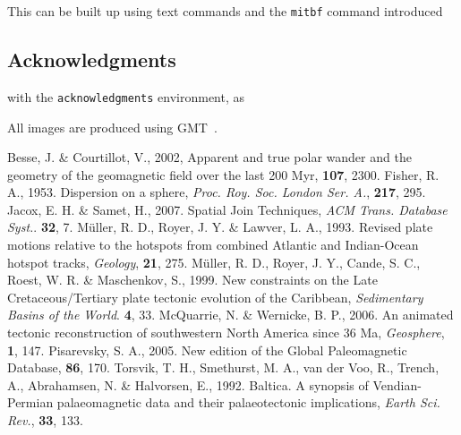 This can be built up using text commands and the \verb"mitbf" command introduced

\subsection{Acknowledgments}
with the \texttt{acknowledgments} environment, as

\begin{acknowledgments}
All images are produced using GMT~\cite{W13}.
\end{acknowledgments}

\begin{thebibliography}{}
  Besse, J. \& Courtillot, V., 2002, Apparent and true polar wander and the
  geometry of the geomagnetic field over the last 200 Myr, \jgr{}\textbf{107},
  2300.
  Fisher, R. A., 1953. Dispersion on a sphere, \textit{Proc. Roy. Soc. London
  Ser. A.}, \textbf{217}, 295.
  Jacox, E. H. \& Samet, H., 2007. Spatial Join Techniques, \textit{ACM Trans.
  Database Syst.}. \textbf{32}, 7.
  M{\"{u}}ller, R. D., Royer, J. Y. \& Lawver, L. A., 1993. Revised plate
  motions relative to the hotspots from combined Atlantic and Indian-Ocean
  hotspot tracks, \textit{Geology}, \textbf{21}, 275.
  M{\"{u}}ller, R. D., Royer, J. Y., Cande, S. C., Roest, W. R. \& Maschenkov,
  S., 1999. New constraints on the Late Cretaceous/Tertiary plate tectonic
  evolution of the Caribbean, \textit{Sedimentary Basins of the World}.
  \textbf{4}, 33.
  McQuarrie, N. \& Wernicke, B. P., 2006. An animated tectonic reconstruction of
  southwestern North America since 36 Ma, \textit{Geosphere}, \textbf{1},
  147.
  Pisarevsky, S. A., 2005. New edition of the Global Paleomagnetic Database,
  \eos{}\textbf{86}, 170.
  Torsvik, T. H., Smethurst, M. A., van der Voo, R., Trench, A., Abrahamsen, N.
  \& Halvorsen, E., 1992. Baltica. A synopsis of Vendian-Permian palaeomagnetic
  data and their palaeotectonic implications, \textit{Earth Sci. Rev.},
  \textbf{33}, 133.

\end{thebibliography}
